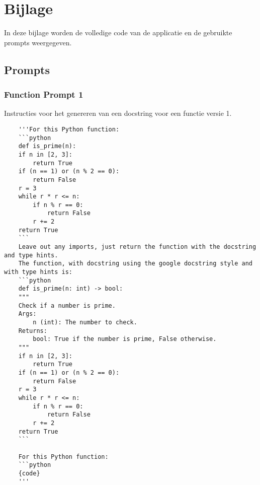 
\chapter{Bijlage}
\label{bijlage}

In deze bijlage worden de volledige code van de applicatie en de gebruikte prompts weergegeven.

\section{Prompts}
\label{bijlage:prompts}

\subsection{Function Prompt 1}
\label{bijlage:prompt1}
Instructies voor het genereren van een docstring voor een functie versie 1.
\begin{verbatim}
    '''For this Python function:
    ```python	
    def is_prime(n):
    if n in [2, 3]:
        return True
    if (n == 1) or (n % 2 == 0):
        return False
    r = 3
    while r * r <= n:
        if n % r == 0:
            return False
        r += 2
    return True
    ```
    Leave out any imports, just return the function with the docstring and type hints.
    The function, with docstring using the google docstring style and with type hints is:
    ```python	
    def is_prime(n: int) -> bool:
    """
    Check if a number is prime.
    Args:
        n (int): The number to check.
    Returns:
        bool: True if the number is prime, False otherwise.
    """
    if n in [2, 3]:
        return True
    if (n == 1) or (n % 2 == 0):
        return False
    r = 3
    while r * r <= n:
        if n % r == 0:
            return False
        r += 2
    return True
    ```
    
    For this Python function:
    ```python	
    {code}
    '''
\end{verbatim}

